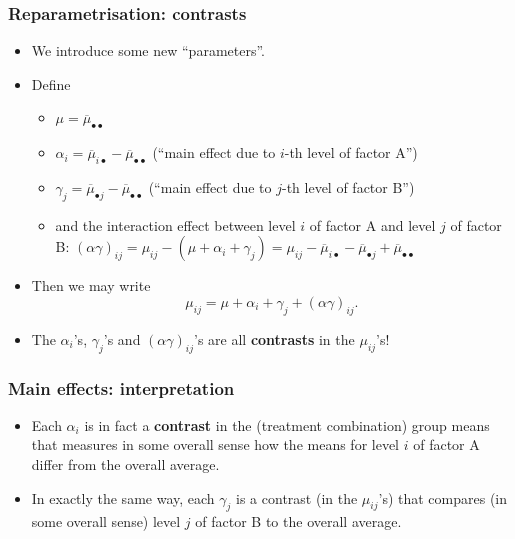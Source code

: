 \documentclass[a4paper]{article}
\begin{document}
\subsubsection{Reparametrisation: contrasts}
\begin{itemize}
	\item We introduce some new ``parameters''.
	\item Define
	\begin{itemize}
		\item \( \mu = \overline\mu_{\bullet\bullet} \) 
		\item \( \alpha_i = \overline{\mu}_{i\bullet}-\overline\mu_{\bullet\bullet} \) (``main effect due to \( i \)-th level of factor A'')
		\item \( \gamma_j = \overline{\mu}_{\bullet j}-\overline\mu_{\bullet\bullet} \) (``main effect due to \( j \)-th level of factor B'')
		\item and the interaction effect between level \( i \) of factor A and level \( j \) of factor B: \( (\alpha\gamma)_{ij} = \mu_{ij}-(\mu+\alpha_i+\gamma_j) =\mu_{ij}-\overline \mu_{i\bullet} -\overline\mu_{\bullet j}+\overline \mu_{\bullet\bullet} \) 
	\end{itemize}
	\item Then we may write
	\[
		\mu_{ij}=\mu + \alpha_i + \gamma_j + (\alpha\gamma)_{ij}.
	\]
	\item The \( \alpha_i \)'s, \( \gamma_j \)'s and \( (\alpha \gamma)_{ij} \)'s are all \textbf{contrasts} in the \( \mu_{ij} \)'s!
\end{itemize}
\subsubsection{Main effects: interpretation}
\begin{itemize}
	\item Each \( \alpha_i \) is in fact a \textbf{contrast} in the (treatment combination) group means that measures in some overall sense how the means for level \( i \) of factor A differ from the overall average.
	\item In exactly the same way, each \( \gamma_j \) is a contrast (in the \( \mu_{ij} \)'s) that compares (in some overall sense) level \( j \) of factor B to the overall average.
\end{itemize}
\end{document}
